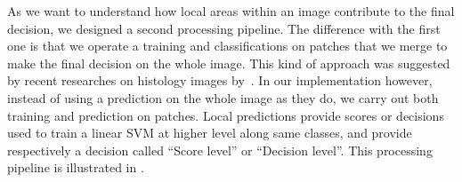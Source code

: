 As we want to understand how local areas within an image contribute to the final decision, we designed a second processing pipeline. The difference with the first one is that we operate a training and classifications on patches that we merge to make the final decision on the whole image. This kind of approach was suggested by recent researches on histology images by~\cite{Xu2015,Hou2016}. In our implementation however, instead of using a prediction on the whole image as they do, we carry out both training and prediction on patches. Local predictions provide scores or decisions used to train a linear SVM at higher level along same classes, and provide respectively a decision called “Score level” or “Decision level”. This processing pipeline is illustrated in .\par